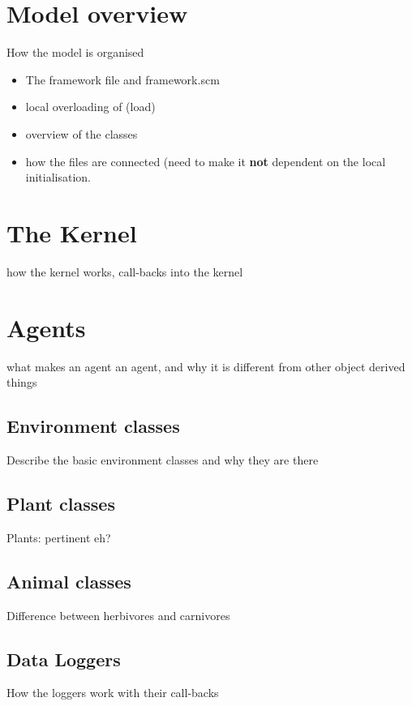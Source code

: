 \section{Model overview}
How the model is organised
\begin{itemize}
\item The framework file and framework.scm
\item local overloading of (load)
\item overview of the classes
\item how the files are connected (need to make it \textbf{not}
dependent on the local initialisation.
\end{itemize}

\section{The Kernel}
how the kernel works, call-backs into the kernel

\section{Agents}
what makes an agent an agent, and why it is different from other object
derived things

\subsection{Environment classes}
Describe the basic environment classes and why they are there

\subsection{Plant classes}
Plants: pertinent eh?

\subsection{Animal classes}
Difference between herbivores and carnivores

\subsection{Data Loggers}
How the loggers work with their call-backs

